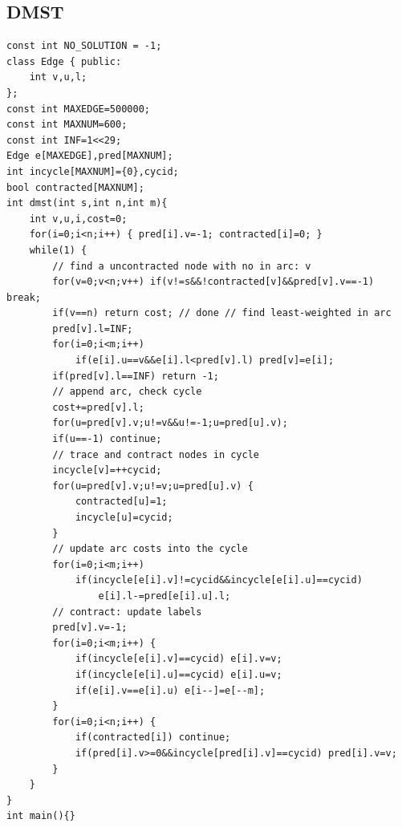 \documentclass[10pt,twocolumn,oneside]{article}
\begin{document}
\subsection{DMST}
\begin{lstlisting}
const int NO_SOLUTION = -1;
class Edge { public:
    int v,u,l;
};
const int MAXEDGE=500000;
const int MAXNUM=600;
const int INF=1<<29;
Edge e[MAXEDGE],pred[MAXNUM];
int incycle[MAXNUM]={0},cycid;
bool contracted[MAXNUM];
int dmst(int s,int n,int m){
    int v,u,i,cost=0;
    for(i=0;i<n;i++) { pred[i].v=-1; contracted[i]=0; }
    while(1) {
        // find a uncontracted node with no in arc: v
        for(v=0;v<n;v++) if(v!=s&&!contracted[v]&&pred[v].v==-1) break;
        if(v==n) return cost; // done // find least-weighted in arc
        pred[v].l=INF;
        for(i=0;i<m;i++)
            if(e[i].u==v&&e[i].l<pred[v].l) pred[v]=e[i];
        if(pred[v].l==INF) return -1;
        // append arc, check cycle
        cost+=pred[v].l;
        for(u=pred[v].v;u!=v&&u!=-1;u=pred[u].v);
        if(u==-1) continue;
        // trace and contract nodes in cycle
        incycle[v]=++cycid;
        for(u=pred[v].v;u!=v;u=pred[u].v) {
            contracted[u]=1;
            incycle[u]=cycid;
        }
        // update arc costs into the cycle
        for(i=0;i<m;i++)
            if(incycle[e[i].v]!=cycid&&incycle[e[i].u]==cycid)
                e[i].l-=pred[e[i].u].l;
        // contract: update labels
        pred[v].v=-1;
        for(i=0;i<m;i++) {
            if(incycle[e[i].v]==cycid) e[i].v=v;
            if(incycle[e[i].u]==cycid) e[i].u=v;
            if(e[i].v==e[i].u) e[i--]=e[--m];
        }
        for(i=0;i<n;i++) {
            if(contracted[i]) continue;
            if(pred[i].v>=0&&incycle[pred[i].v]==cycid) pred[i].v=v;
        }
    }
}
int main(){}
\end{lstlisting}
\end{document}
